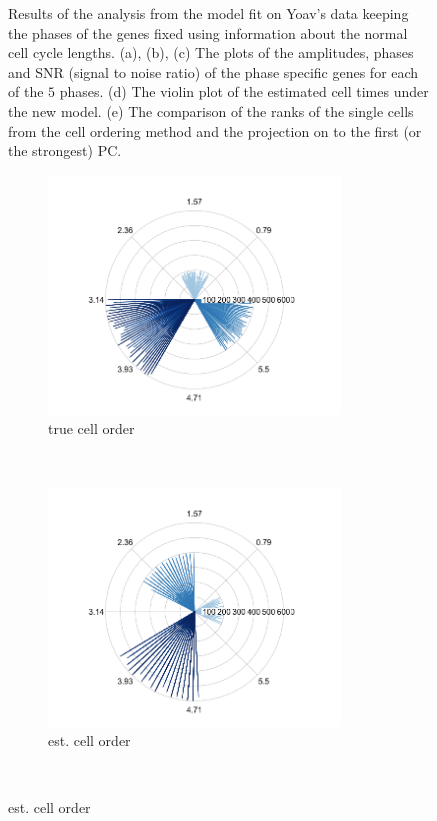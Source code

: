 \documentclass[11pt]{article}
\begin{document}
\begin{figure}[ht]
    \caption{Results of the analysis from the model fit on Yoav's data keeping the phases of the genes fixed using information about the normal cell cycle lengths. (a), (b), (c) The plots of the amplitudes, phases and SNR (signal to noise ratio) of the phase specific genes for each of the $5$ phases. (d) The violin plot of the estimated cell times under the new model. (e) The comparison of the ranks of the single cells from the cell ordering method and the projection on to the first (or the strongest) PC.}
 \label{fig:fig7}
 \end{figure}
 
 
  \begin{figure}[ht]
    \centering    
     \begin{subfigure}[t]{0.5\textwidth}
        \centering
        \includegraphics[height=2.5in]{../figures/cell_order_R_figs/true_cell_order_sim3.png}
        \caption{true cell order}
    \end{subfigure}%
    ~
    \begin{subfigure}[t]{0.5\textwidth}
        \centering
        \includegraphics[height=2.5in]{../figures/cell_order_R_figs/est_cell_order_sim3.png}
        \caption{est. cell order}
    \end{subfigure}\\
    

\end{figure}
\end{document}
